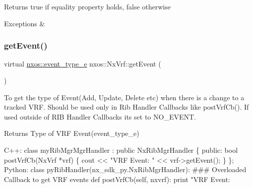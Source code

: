 \begin{DoxyReturn}{Returns}
true if equality property holds, false otherwise
\end{DoxyReturn}

\begin{DoxyCode}
\end{DoxyCode}



\begin{DoxyExceptions}{Exceptions}
{\em } & \\
\hline
\end{DoxyExceptions}
\mbox{\label{classnxos_1_1_nx_vrf_a42bdba27e42981d74066a72c24809c98}} 
\subsubsection{\texorpdfstring{get\+Event()}{getEvent()}}
{\footnotesize\ttfamily virtual \mbox{\hyperlink{nx__common_8h_af9a9040b7681199d386e94eb888018cb}{nxos\+::event\+\_\+type\+\_\+e}} nxos\+::\+Nx\+Vrf\+::get\+Event (\begin{DoxyParamCaption}{ }\end{DoxyParamCaption})\hspace{0.3cm}{\ttfamily [pure virtual]}}

To get the type of Event(\+Add, Update, Delete etc) when there is a change to a tracked V\+RF. Should be used only in Rib Handler Callbacks like post\+Vrf\+Cb(). If used outside of R\+IB Handler Callbacks its set to N\+O\+\_\+\+E\+V\+E\+NT.

\begin{DoxyReturn}{Returns}
Type of V\+RF Event(event\+\_\+type\+\_\+e)
\end{DoxyReturn}

\begin{DoxyCode}
C++:
   \textcolor{keyword}{class }myRibMgrMgrHandler : \textcolor{keyword}{public} NxRibMgrHandler \{
      \textcolor{keyword}{public}:
         \textcolor{keywordtype}{bool} postVrfCb(NxVrf *vrf) \{
              cout << \textcolor{stringliteral}{"VRF Event: "} << vrf->getEvent();
         \}
   \};
Python:
   \textcolor{keyword}{class }pyRibHandler(nx\_sdk\_py.NxRibMgrHandler):
\textcolor{preprocessor}{   ### Overloaded Callback to get VRF events}
         def postVrfCb(self, nxvrf):
             print "VRF Event: %
\end{DoxyCode}
 \mbox{\label{classnxos_1_1_nx_vrf_a4ab30d5ff7a1d5d2abbab21652cd59fa}} 
